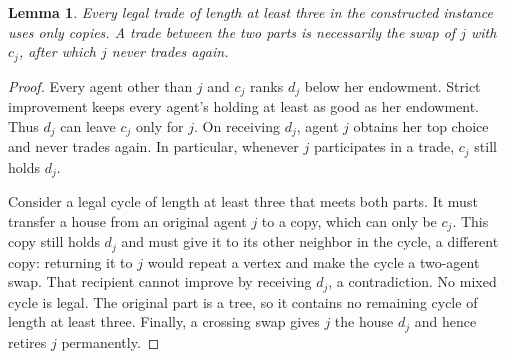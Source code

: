 \documentclass[11pt]{article}
\newtheorem{lemma}{Lemma}
\begin{document}
\begin{lemma}\label{cut}
Every legal trade of length at least three in the constructed instance
uses only copies. A trade between the two parts is necessarily the swap
of $j$ with $c_j$, after which $j$ never trades again.
\end{lemma}
\begin{proof}
Every agent other than $j$ and $c_j$ ranks $d_j$ below her endowment. Strict improvement keeps every agent's holding
at least as good as her endowment. Thus $d_j$ can leave $c_j$ only for
$j$. On receiving $d_j$, agent $j$ obtains her top choice and never
trades again. In particular, whenever $j$ participates in a trade,
$c_j$ still holds $d_j$.

Consider a legal cycle of length at least three that meets both parts.
It must transfer a house from an original agent $j$ to a copy, which
can only be $c_j$. This copy still holds $d_j$ and must give it to
its other neighbor in the cycle, a different copy: returning it to $j$
would repeat a vertex and make the cycle a two-agent swap. That recipient
cannot improve by receiving $d_j$, a contradiction. No mixed cycle is
legal. The original part is a tree, so it contains no remaining cycle
of length at least three. Finally, a crossing swap gives $j$ the house
$d_j$ and hence retires $j$ permanently.
\end{proof}
\end{document}
